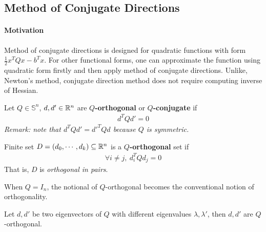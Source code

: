 \documentclass{article}
\begin{document}
	\subsection{Method of Conjugate Directions}
	\paragraph{Motivation} Method of conjugate directions is designed for quadratic functions with form $\frac{1}{2} x^T Q x - b^T x$. For other functional forms, one can approximate the function using quadratic form firstly and then apply method of conjugate directions. Unlike, Newton's method, conjugate direction method does not require computing inverse of Hessian.
	
	\begin{definition}
		Let $Q \in \mathbb{S}^n$, $d, d' \in \mathbb{R}^n$ are \textbf{$Q$-orthogonal} or \textbf{$Q$-conjugate} if 
		\begin{align}
			d^T Q d' = 0
		\end{align}
		\emph{Remark: note that $d^T Q d' = d'^T Q d$ because $Q$ is symmetric.}
	\end{definition}
	
	\begin{definition}
		Finite set $D = (d_0, \cdots, d_k) \subseteq \mathbb{R}^n$ is a \textbf{$Q$-orthogonal} set if
		\begin{align}
			\forall i \neq j,\ d_i^T Q d_j = 0
		\end{align}
		That is, $D$ is \emph{orthogonal in pairs}.
	\end{definition}
	
	\begin{example}
		When $Q = I_n$, the notional of $Q$-orthogonal becomes the conventional notion of orthogonality.
	\end{example}
	
	\begin{proposition}
		Let $d, d'$ be two eigenvectors of $Q$ with different eigenvalues $\lambda, \lambda'$, then $d, d'$ are $Q$-orthogonal.
	\end{proposition}
	
\end{document}
